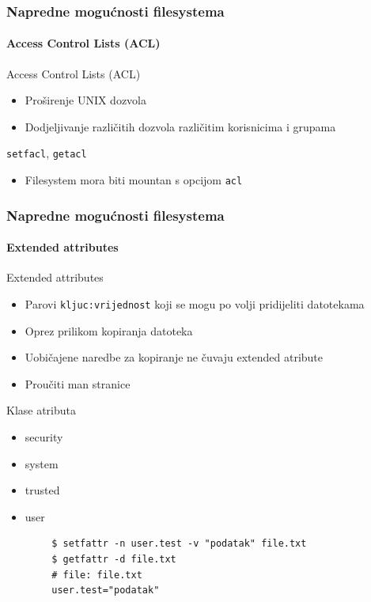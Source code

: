 \documentclass[t]{beamer}
\begin{document}
\begin{frame}
	\frametitle{Napredne mogućnosti filesystema}
	\framesubtitle{Access Control Lists (ACL)}
	Access Control Lists (ACL)
	\begin{itemize}
		\item Proširenje UNIX dozvola
		\item Dodjeljivanje različitih dozvola različitim korisnicima i grupama
	\end{itemize}
	\vspace{1em}
	\texttt{setfacl}, \texttt{getacl}
	\vspace{1em}
	\begin{itemize}
		\item Filesystem mora biti mountan s opcijom \texttt{acl}
	\end{itemize}
\end{frame}

\begin{frame}[fragile]
	\frametitle{Napredne mogućnosti filesystema}
	\framesubtitle{Extended attributes}
	Extended attributes
	\begin{itemize}
		\item Parovi \texttt{kljuc:vrijednost} koji se mogu po volji pridijeliti datotekama
		\item Oprez prilikom kopiranja datoteka
		\item[] Uobičajene naredbe za kopiranje ne čuvaju extended atribute
		\item Proučiti man stranice
	\end{itemize}
	Klase atributa
	\begin{multicols}{2}
		\begin{itemize}
			\item security
			\item system
			\item trusted
			\item user
		\end{itemize}
	\end{multicols}
	{\footnotesize \begin{verbatim}
		$ setfattr -n user.test -v "podatak" file.txt
		$ getfattr -d file.txt
		# file: file.txt
		user.test="podatak"
		\end{verbatim}}
\end{frame}
\end{document}

